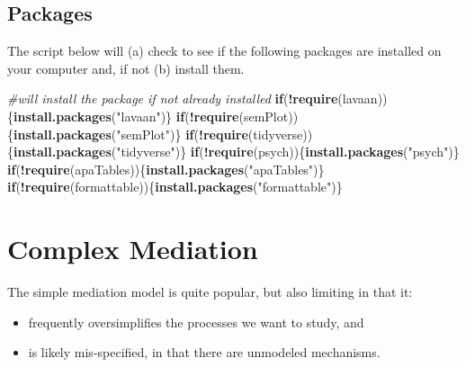 \documentclass[
  11pt,
]{book}
\newenvironment{Shaded}{\begin{snugshade}}{\end{snugshade}}
\newcommand{\CommentTok}[1]{\textcolor[rgb]{0.37,0.37,0.37}{\textit{#1}}}
\newcommand{\ControlFlowTok}[1]{\textcolor[rgb]{0.27,0.27,0.27}{\textbf{#1}}}
\newcommand{\FunctionTok}[1]{\textcolor[rgb]{0.27,0.27,0.27}{\textbf{#1}}}
\newcommand{\NormalTok}[1]{#1}
\newcommand{\SpecialCharTok}[1]{\textcolor[rgb]{0.43,0.43,0.43}{\textbf{#1}}}
\newcommand{\StringTok}[1]{\textcolor[rgb]{0.5,0.5,0.5}{#1}}
\providecommand{\tightlist}{%
  \setlength{\itemsep}{0pt}\setlength{\parskip}{0pt}}
\begin{document}
\hypertarget{packages-5}{%
\subsection{Packages}\label{packages-5}}

The script below will (a) check to see if the following packages are installed on your computer and, if not (b) install them.

\begin{Shaded}
\begin{Highlighting}[]
\CommentTok{\#will install the package if not already installed}
\ControlFlowTok{if}\NormalTok{(}\SpecialCharTok{!}\FunctionTok{require}\NormalTok{(lavaan))\{}\FunctionTok{install.packages}\NormalTok{(}\StringTok{"lavaan"}\NormalTok{)\}}
\ControlFlowTok{if}\NormalTok{(}\SpecialCharTok{!}\FunctionTok{require}\NormalTok{(semPlot))\{}\FunctionTok{install.packages}\NormalTok{(}\StringTok{"semPlot"}\NormalTok{)\}}
\ControlFlowTok{if}\NormalTok{(}\SpecialCharTok{!}\FunctionTok{require}\NormalTok{(tidyverse))\{}\FunctionTok{install.packages}\NormalTok{(}\StringTok{"tidyverse"}\NormalTok{)\}}
\ControlFlowTok{if}\NormalTok{(}\SpecialCharTok{!}\FunctionTok{require}\NormalTok{(psych))\{}\FunctionTok{install.packages}\NormalTok{(}\StringTok{"psych"}\NormalTok{)\}}
\ControlFlowTok{if}\NormalTok{(}\SpecialCharTok{!}\FunctionTok{require}\NormalTok{(apaTables))\{}\FunctionTok{install.packages}\NormalTok{(}\StringTok{"apaTables"}\NormalTok{)\}}
\ControlFlowTok{if}\NormalTok{(}\SpecialCharTok{!}\FunctionTok{require}\NormalTok{(formattable))\{}\FunctionTok{install.packages}\NormalTok{(}\StringTok{"formattable"}\NormalTok{)\}}
\end{Highlighting}
\end{Shaded}

\hypertarget{complex-mediation}{%
\section{Complex Mediation}\label{complex-mediation}}

The simple mediation model is quite popular, but also limiting in that it:

\begin{itemize}
\tightlist
\item
  frequently oversimplifies the processes we want to study, and
\item
  is likely mis-specified, in that there are unmodeled mechanisms.
\end{itemize}
\end{document}
